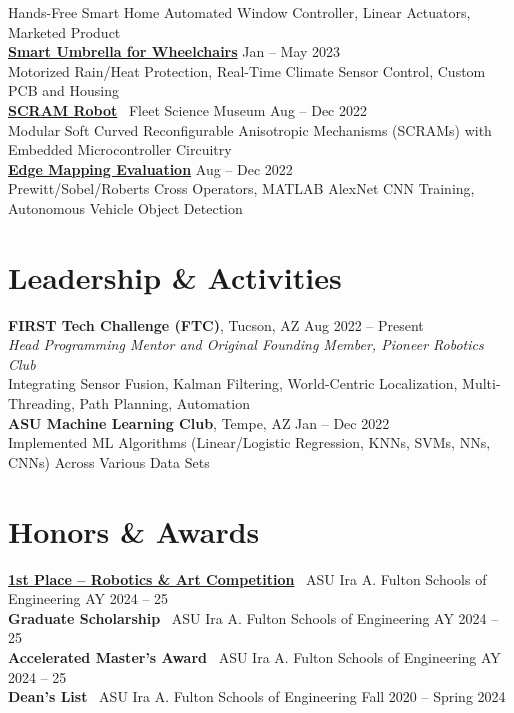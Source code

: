 \documentclass[10pt]{article}
\begin{document}
\hspace*{2em}Hands-Free Smart Home Automated Window Controller, Linear Actuators, Marketed Product
\\
\textbf{\href{https://EGR314-Team205.github.io}{Smart Umbrella for Wheelchairs}} \hfill Jan -- May 2023 \\
\hspace*{2em}Motorized Rain/Heat Protection, Real-Time Climate Sensor Control, Custom PCB and Housing
\\
\textbf{\href{https://www.youtube.com/watch?v=rs_C8sR2_co}{SCRAM Robot}} \textbar\ Fleet Science Museum \hfill Aug -- Dec 2022 \\
\hspace*{2em}Modular Soft Curved Reconfigurable Anisotropic Mechanisms (SCRAMs) with Embedded Microcontroller Circuitry
\\
\textbf{\href{https://github.com/MGross21/EdgeMappingResearchProject}{Edge Mapping Evaluation}} \hfill Aug -- Dec 2022 \\
\hspace*{2em}Prewitt/Sobel/Roberts Cross Operators, MATLAB AlexNet CNN Training, Autonomous Vehicle Object Detection

\section*{Leadership \& Activities}
\textbf{FIRST Tech Challenge (FTC)}, Tucson, AZ \hfill Aug 2022 -- Present \\
\textit{Head Programming Mentor and Original Founding Member, Pioneer Robotics Club}\\
\hspace*{2em}Integrating Sensor Fusion, Kalman Filtering, World-Centric Localization, Multi-Threading, Path Planning, Automation
\\
\textbf{ASU Machine Learning Club}, Tempe, AZ \hfill Jan -- Dec 2022 \\
\hspace*{2em}Implemented ML Algorithms (Linear/Logistic Regression, KNNs, SVMs, NNs, CNNs) Across Various Data Sets

\section*{Honors \& Awards}
\textbf{\href{https://www.linkedin.com/posts/mhgross_asuengineering-design-robotics-activity-7324315472491855873-Gn_C}{1st Place -- Robotics \& Art Competition}} \textbar\ ASU Ira A. Fulton Schools of Engineering \hfill AY 2024 -- 25 \\
\textbf{Graduate Scholarship} \textbar\ ASU Ira A. Fulton Schools of Engineering \hfill AY 2024 -- 25 \\
\textbf{Accelerated Master's Award} \textbar\ ASU Ira A. Fulton Schools of Engineering \hfill AY 2024 -- 25\\
\textbf{Dean's List} \textbar\ ASU Ira A. Fulton Schools of Engineering \hfill Fall 2020 -- Spring 2024
\end{document}
